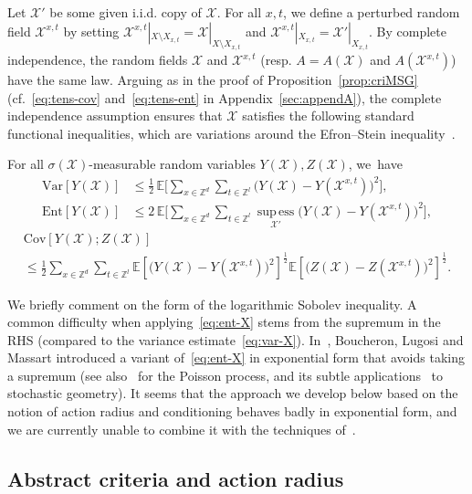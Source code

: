 \documentclass[AHL,Unicode,longabstracts]{cedram}
\newcommand{\Z}{\mathbb Z}
\newcommand{\expecM}[1]{\mathbb{E}\bigg[#1 \bigg]}
\newcommand{\expec}[1]{\mathbb{E}\left[#1 \right]}
\newcommand{\X}{\mathcal X}
\DeclareMathOperator{\supess}{sup\,ess}
\newcommand{\supessd}[1]{\mathrel{\mathop{\supess}\limits_{#1}}}
\newcommand{\var}[1]{\mathrm{Var}\left[#1\right]}
\newcommand{\ent}[1]{\mathrm{Ent}\!\left[#1\right]}
\newcommand{\cov}[2]{\mathrm{Cov}\left[#1;#2\right]}
\begin{document}

Let $\X'$ be some given i.i.d. copy of $\X$. For all $x,t$, we define a perturbed random field $\X^{x,t}$ by setting $\X^{x,t}|_{X\setminus X_{x,t}}=\X|_{X\setminus X_{x,t}}$ and $\X^{x,t}|_{X_{x,t}}=\X'|_{X_{x,t}}$. By complete independence, the random fields $\X$ and $\X^{x,t}$ (resp. $A=A(\X)$ and $A(\X^{x,t})$) have the same law. Arguing as in the proof of Proposition~\ref{prop:criMSG} (cf.~\eqref{eq:tens-cov} and~\eqref{eq:tens-ent} in Appendix~\ref{sec:appendA}), the complete independence assumption ensures that $\X$ satisfies the following standard functional inequalities, which are variations around the Efron--Stein inequality~\cite{Efron-Stein-81,Steele-86}.

\begin{prop}\label{prop:sgindep}
For all $\sigma(\X)$-measurable random variables $Y(\X),Z(\X)$, we~have
\begin{align}
\var{Y(\X)}&\le\frac12\,\expecM{\sum_{x\in\Z^d}\sum_{t\in\Z^l}\big(Y(\X)-Y(\X^{x,t})\big)^2},\label{eq:var-X}
\\
\ent{Y(\X)}&\le 2\,\expecM{\sum_{x\in\Z^d}\sum_{t\in\Z^l}\supessd{\X'}\big(Y(\X)-Y(\X^{x,t})\big)^2},\label{eq:ent-X}
\end{align}
\begin{multline}\label{eq:cov-X}
\cov{Y(\X)}{Z(\X)}\\
\le \frac12\sum_{x\in\Z^d}\sum_{t\in\Z^l}\expec{ \big(Y(\X)-Y(\X^{x,t})\big)^2}^\frac12\expec{ \big(Z(\X)-Z(\X^{x,t})\big)^2}^\frac12.
\end{multline}
\qedhere
\end{prop}

We briefly comment on the form of the logarithmic Sobolev inequality. A common difficulty when applying~\eqref{eq:ent-X} stems from the supremum in the RHS (compared to the variance estimate~\eqref{eq:var-X}). In~\cite{BLM-03}, Boucheron, Lugosi and Massart introduced a variant of~\eqref{eq:ent-X} in exponential form that avoids taking a supremum (see also~\cite{Wu00} for the Poisson process, and its subtle applications~\cite{BachPec} to stochastic geometry). It seems that the approach we develop below based on the notion of action radius and conditioning behaves badly in exponential form, and we are currently unable to combine it with the techniques of~\cite{BLM-03}.



\subsection{Abstract criteria and action radius}\label{chap:condunif-pasunif}
\end{document}
